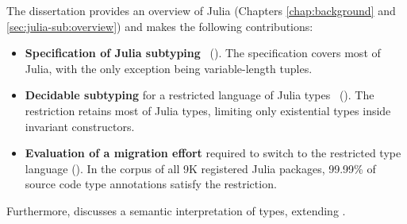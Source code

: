The dissertation provides an overview of Julia
(Chapters \ref{chap:background} and \ref{sec:julia-sub:overview})
and makes the following contributions:
\begin{itemize}
  \item \textbf{Specification of Julia
    subtyping}~\citep*{bib:zappa-nardelli:julia-sub:oopsla:2018}
    ().
    The specification covers most of Julia, with the only exception being
    variable-length tuples.
  \item \textbf{Decidable subtyping} for a restricted language of Julia 
    types~\citep*{bib:belyakova:julia-sub-dec:draft} ().
    The restriction retains most of Julia types, limiting only existential types
    inside invariant constructors.
  \item \textbf{Evaluation of a migration effort} required to switch to 
    the restricted type language (). 
    In the corpus of all 9K registered Julia packages, 99.99\% of source code 
    type annotations satisfy the restriction.
\end{itemize}
Furthermore,  discusses a semantic interpretation
of types, extending \cite{bib:belyakova:minijl-sub:ftfjp:2019}.


